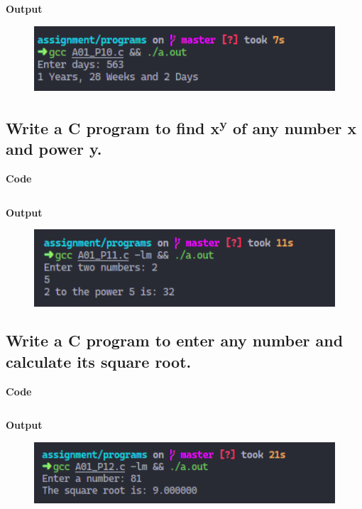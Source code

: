 \documentclass[a4paper]{article}
\begin{document}
\inputminted{C}{programs/A01_P10.c}

\textbf{Output}

\begin{figure}[h]
  \includegraphics[width=12cm]{A01_P10}
\end{figure}

\newpage



\subsection{Write a C program to find x\textsuperscript{y} of any number x and power y.}
\textbf{Code}

\inputminted{C}{programs/A01_P11.c}

\textbf{Output}

\begin{figure}[h]
  \includegraphics[width=12cm]{A01_P11}
\end{figure}

\newpage



\subsection{Write a C program to enter any number and calculate its square root.}
\textbf{Code}

\inputminted{C}{programs/A01_P12.c}

\textbf{Output}

\begin{figure}[h]
  \includegraphics[width=12cm]{A01_P12}
\end{figure}
\end{document}
